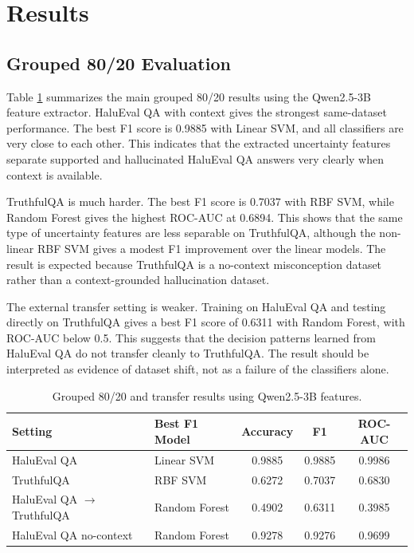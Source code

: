 \documentclass[11pt]{article}
\begin{document}
\section{Results}

\subsection{Grouped 80/20 Evaluation}
Table \ref{tab:grouped-80-20-results} summarizes the main grouped 80/20 results using the Qwen2.5-3B feature extractor. HaluEval QA with context gives the strongest same-dataset performance. The best F1 score is 0.9885 with Linear SVM, and all classifiers are very close to each other. This indicates that the extracted uncertainty features separate supported and hallucinated HaluEval QA answers very clearly when context is available.

TruthfulQA is much harder. The best F1 score is 0.7037 with RBF SVM, while Random Forest gives the highest ROC-AUC at 0.6894. This shows that the same type of uncertainty features are less separable on TruthfulQA, although the non-linear RBF SVM gives a modest F1 improvement over the linear models. The result is expected because TruthfulQA is a no-context misconception dataset rather than a context-grounded hallucination dataset.

The external transfer setting is weaker. Training on HaluEval QA and testing directly on TruthfulQA gives a best F1 score of 0.6311 with Random Forest, with ROC-AUC below 0.5. This suggests that the decision patterns learned from HaluEval QA do not transfer cleanly to TruthfulQA. The result should be interpreted as evidence of dataset shift, not as a failure of the classifiers alone.

\begin{table}[H]
    \centering
    \small
    \begin{tabular}{llccc}
        \toprule
        Setting & Best F1 Model & Accuracy & F1 & ROC-AUC \\
        \midrule
        HaluEval QA & Linear SVM & 0.9885 & 0.9885 & 0.9986 \\
        TruthfulQA & RBF SVM & 0.6272 & 0.7037 & 0.6830 \\
        HaluEval QA $\rightarrow$ TruthfulQA & Random Forest & 0.4902 & 0.6311 & 0.3985 \\
        HaluEval QA no-context & Random Forest & 0.9278 & 0.9276 & 0.9699 \\
        \bottomrule
    \end{tabular}
    \caption{Grouped 80/20 and transfer results using Qwen2.5-3B features.}
    \label{tab:grouped-80-20-results}
\end{table}
\end{document}
